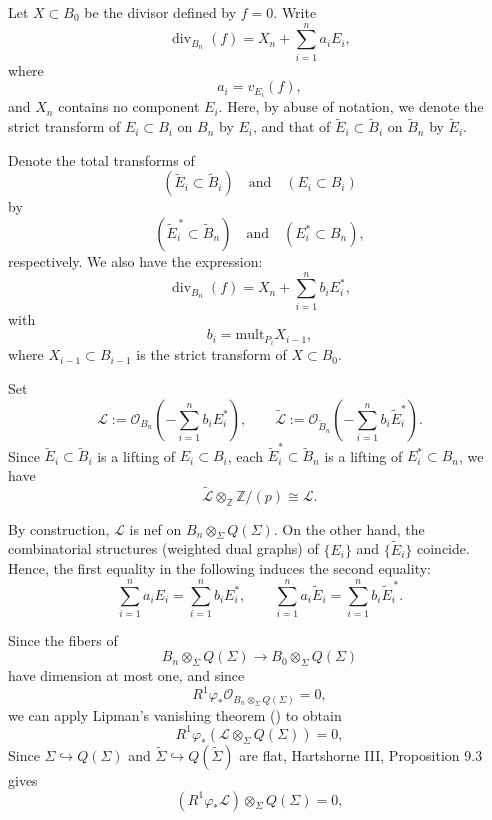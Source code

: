 \documentclass[a4paper]{amsart}
\newcommand{\mult}{{\mathrm{mult}}}
\newcommand{\we}{{\widetilde E}}
\newcommand{\wB}{{\widetilde{B}}}
\newcommand{\wv}{{\widetilde{\varphi}}}
\renewcommand{\L}{{\mathcal{L}}}
\newcommand{\wL}{{\widetilde{\L}}}
\theoremstyle{definition}
\begin{document}
Let \(X \subset B_0\) be the divisor defined by \(f=0\). Write
\[
\operatorname{div}_{B_n}(f)=X_n+\sum_{i=1}^n a_iE_i,
\]
where
\[
a_i=v_{E_i}(f),
\]
and \(X_n\) contains no component \(E_i\). 
Here, by abuse of notation, we denote the strict transform of $E_i \subset B_i$ on $B_n$ by $E_i$, and that of $\we_i \subset \wB_i$ on $\wB_n$ by $\we_i$.

Denote the total transforms of
\[
(\we_i \subset \wB_i) \quad \text{and} \quad (E_i \subset B_i)
\]
by
\[
(\we_i^{\,*} \subset \widetilde{B}_n) \quad \text{and} \quad (E_i^{*} \subset B_n),
\]
respectively. We also have the expression:
\[
\operatorname{div}_{B_n}(f)=X_n+\sum_{i=1}^n b_iE^*_i,
\]
with
\[
b_i=\mult_{P_i} X_{i-1},
\]
where $X_{i-1}\subset B_{i-1}$ is the strict transform of $X\subset B_0$.









Set
\[
\L:=\mathcal{O}_{B_n}\!\left(-\sum_{i=1}^n b_iE^*_i\right), \qquad
\wL:=\mathcal{O}_{\wB_n}\!\left(-\sum_{i=1}^n b_i\we^*_i\right).
\]
%
Since $\we_i\subset \wB_i$ is a lifting of $E_i\subset B_i$,
each \(\we^*_i\subset \wB_n\) is a lifting of \(E^*_i\subset B_n\), we have
\[
\wL\otimes_{\mathbb{Z}}\mathbb{Z}/(p)\cong \L.
\]

By construction, \(\L\) is nef on \(B_n \otimes_{\Sigma} Q(\Sigma)\). On the other
hand,  the combinatorial structures (weighted dual graphs) of
 \(\{E_i\}\) and \(\{\we_i\}\)
coincide. Hence, the first equality in the following induces the second equality: 
\[
\sum_{i=1}^n a_iE_i=\sum_{i=1}^n b_iE_i^{*},
\qquad
\sum_{i=1}^n a_i\we_i=\sum_{i=1}^n b_i\we_i^{\,*}.
\]

Since the fibers of
\[
B_n \otimes_{\Sigma} Q(\Sigma) \to B_0 \otimes_{\Sigma} Q(\Sigma)
\]
have dimension at most one, and since
\[
R^1\varphi_*\mathcal{O}_{B_n \otimes_{\Sigma} Q(\Sigma)}=0,
\]
we can apply Lipman's vanishing theorem (\cite[Theorem 12.1, (ii)]{l}) to obtain
\[
R^1\varphi_*\!\left(\L \otimes_{\Sigma} Q(\Sigma)\right)=0,
\]
Since \(\Sigma \hookrightarrow Q(\Sigma)\) and
\(\widetilde{\Sigma} \hookrightarrow Q(\widetilde{\Sigma})\) are flat, Hartshorne
III, Proposition 9.3 gives
\[
(R^1\varphi_*\L)\otimes_{\Sigma} Q(\Sigma)=0,
\]
\end{document}
